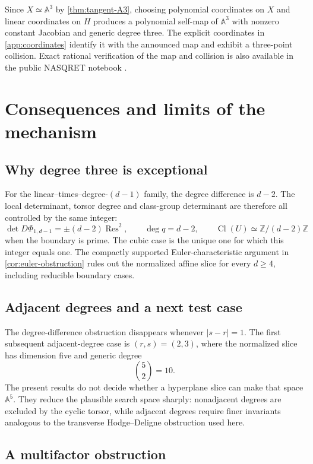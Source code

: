 \documentclass[11pt,reqno]{amsart}
\theoremstyle{definition}
\theoremstyle{remark}
\newcommand{\A}{\mathbb A}
\newcommand{\Z}{\mathbb Z}
\newcommand{\Res}{\operatorname{Res}}
\newcommand{\Cl}{\operatorname{Cl}}
\newcommand{\abs}[1]{\lvert #1\rvert}
\begin{document}
Since $X\simeq\A^3$ by \cref{thm:tangent-A3}, choosing polynomial
coordinates on $X$ and linear coordinates on $H$ produces a polynomial
self-map of $\A^3$ with nonzero constant Jacobian and generic degree
three.  The explicit coordinates in \cref{app:coordinates} identify it
with the announced map and exhibit a three-point collision.  Exact
rational verification of the map and collision is also available in the
public NASQRET notebook \cite{NasqretVerification}.

\section{Consequences and limits of the mechanism}

\subsection{Why degree three is exceptional}

For the linear--times--degree-$(d-1)$ family, the degree difference is
$d-2$.  The local determinant, torsor degree and class-group determinant
are therefore all controlled by the same integer:
\[
 \det D\Phi_{1,d-1}=\pm(d-2)\Res^2,
 \qquad
 \deg q=d-2,
 \qquad
 \Cl(U)\simeq\Z/(d-2)\Z
\]
when the boundary is prime.  The cubic case is the unique one for which
this integer equals one.  The compactly supported Euler-characteristic
argument in \cref{cor:euler-obstruction} rules out the normalized affine
slice for every $d\ge4$, including reducible boundary cases.

\subsection{Adjacent degrees and a next test case}

The degree-difference obstruction disappears whenever $\abs{s-r}=1$.
The first subsequent adjacent-degree case is $(r,s)=(2,3)$, where the
normalized slice has dimension five and generic degree
\[
 \binom52=10.
\]
The present results do not decide whether a hyperplane slice can make
that space $\A^5$.  They reduce the plausible search space sharply:
nonadjacent degrees are excluded by the cyclic torsor, while adjacent
degrees require finer invariants analogous to the transverse
Hodge--Deligne obstruction used here.

\subsection{A multifactor obstruction}
\end{document}
